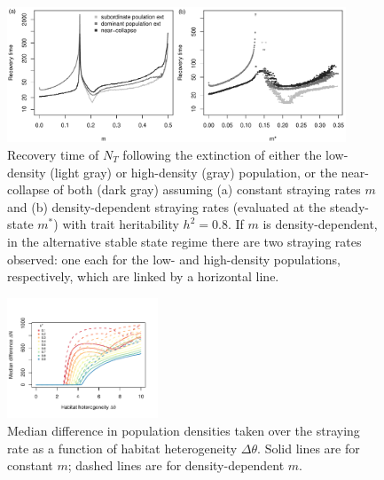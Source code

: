 \documentclass{revtex4}
\begin{document}
\begin{figure}
  \captionsetup{justification=raggedright,
singlelinecheck=false
}
\centering
\includegraphics[width=0.9\textwidth]{fig_relax_highh.pdf}
\caption{
Recovery time of $N_T$ following the extinction of either the low-density (light gray) or high-density (gray) population, or the near-collapse of both (dark gray) assuming (a) constant straying rates $m$ and (b) density-dependent straying rates (evaluated at the steady-state $m^*$) with trait heritability $h^2=0.8$.
If $m$ is density-dependent, in the alternative stable state regime there are two straying rates observed: one each for the low- and high-density populations, respectively, which are linked by a horizontal line.
} \label{fig:relax_highh}
\end{figure}



\begin{figure}
  \captionsetup{justification=raggedright,
singlelinecheck=false
}
\centering
\includegraphics[width=0.4\textwidth]{fig_thetadiffN.pdf}
\caption{
Median difference in population densities taken over the straying rate as a function of habitat heterogeneity $\Delta\theta$.
Solid lines are for constant $m$; dashed lines are for density-dependent $m$.} \label{fig:thetadiffN}
\end{figure}
\end{document}
